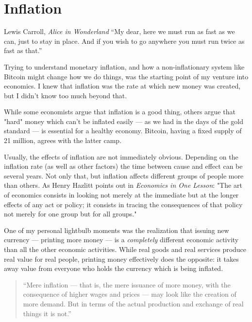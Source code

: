\chapter{Inflation}
\label{les:9}

\begin{chapquote}{Lewis Carroll, \textit{Alice in Wonderland}}
``My dear, here we must run as fast as we can, just to stay in place. And if you
wish to go anywhere you must run twice as fast as that.''
\end{chapquote}

Trying to understand monetary inflation, and how a non-inflationary
system like Bitcoin might change how we do things, was the starting
point of my venture into economics. I knew that inflation was the rate
at which new money was created, but I didn't know too much beyond that.

While some economists argue that inflation is a good thing, others argue
that "hard" money which can't be inflated easily --- as we had in the
days of the gold standard --- is essential for a healthy economy.
Bitcoin, having a fixed supply of 21 million, agrees with the latter
camp.

Usually, the effects of inflation are not immediately obvious. Depending
on the inflation rate (as well as other factors) the time between cause
and effect can be several years. Not only that, but inflation affects
different groups of people more than others. As Henry Hazlitt points out
in \textit{Economics in One Lesson}: "The art of economics consists in looking
not merely at the immediate but at the longer effects of any act or
policy; it consists in tracing the consequences of that policy not
merely for one group but for all groups."

One of my personal lightbulb moments was the realization that issuing
new currency --- printing more money --- is a \textit{completely} different
economic activity than all the other economic activities. While real
goods and real services produce real value for real people, printing
money effectively does the opposite: it takes away value from everyone
who holds the currency which is being inflated.

\begin{quotation}
``Mere inflation --- that is, the mere issuance of more money, with the
consequence of higher wages and prices --- may look like the creation
of more demand. But in terms of the actual production and exchange of
real things it is not.''
\end{quotation}

